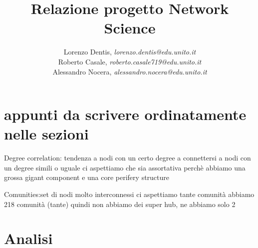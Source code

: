 \documentclass[a4paper]{article}
\begin{document}
\author{
	Lorenzo Dentis, \textit{lorenzo.dentis@edu.unito.it}\\
	Roberto Casale, \textit{roberto.casale719@edu.unito.it}\\
	Alessandro Nocera, \textit{alessandro.nocera@edu.unito.it}
}
\title{Relazione progetto Network Science}
\maketitle

\tableofcontents


\section{appunti da scrivere ordinatamente nelle sezioni}
Degree correlation: tendenza a nodi con un certo degree a connettersi a nodi con un degree simili o uguale
ci aspettiamo che sia assortativa perchè abbiamo una grossa gigant component e una core perifery structure


Comunities:set di nodi molto interconnessi
ci aspettiamo tante comunità
abbiamo 218 comunità (tante) quindi non abbiamo dei super hub, ne abbiamo solo 2

\section{Analisi}
\end{document}
